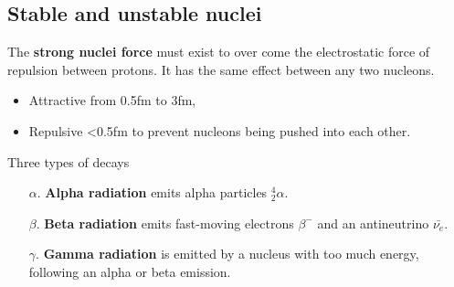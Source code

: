 \subsection{Stable and unstable nuclei}

The \textbf{strong nuclei force} must exist to over come the electrostatic force of repulsion between protons. It has the same effect between any two nucleons.
\begin{itemize}
    \item Attractive from 0.5fm to 3fm,
    \item Repulsive \textless0.5fm to prevent nucleons being pushed into each other.
\end{itemize}

Three types of decays
\begin{enumerate}
    \item[$\alpha$.] \textbf{Alpha radiation} emits alpha particles $^4_2\alpha$.
    \item[$\beta$.] \textbf{Beta radiation} emits fast-moving electrons $\beta^-$ and an antineutrino $\bar{\nu_e}$.
    \item[$\gamma$.] \textbf{Gamma radiation} is emitted by a nucleus with too much energy, following an alpha or beta emission.
\end{enumerate}
